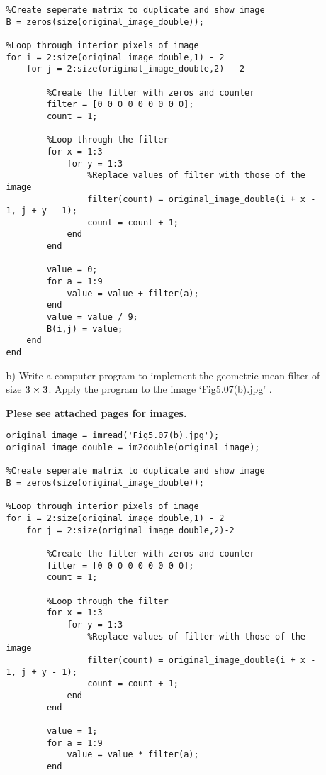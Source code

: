 \documentclass{article}
\begin{document}
\begin{enumerate}
\begin{enumerate}
\begin{lstlisting}
%Create seperate matrix to duplicate and show image
B = zeros(size(original_image_double));

%Loop through interior pixels of image
for i = 2:size(original_image_double,1) - 2
    for j = 2:size(original_image_double,2) - 2
        
        %Create the filter with zeros and counter
        filter = [0 0 0 0 0 0 0 0 0];
        count = 1;
        
        %Loop through the filter
        for x = 1:3
            for y = 1:3
                %Replace values of filter with those of the image
                filter(count) = original_image_double(i + x - 1, j + y - 1);
                count = count + 1;
            end
        end
        
        value = 0;
        for a = 1:9
            value = value + filter(a);
        end
        value = value / 9;
        B(i,j) = value;
    end
end
\end{lstlisting}

\newpage
\item[b)] Write a computer program to implement the geometric mean filter of size $3 \hspace{0.1mm} \times \hspace{0.1mm} 3$. Apply the program to the image `Fig5.07(b).jpg' .

\textbf{Plese see attached pages for images.}

\begin{lstlisting}
original_image = imread('Fig5.07(b).jpg');
original_image_double = im2double(original_image);

%Create seperate matrix to duplicate and show image
B = zeros(size(original_image_double));

%Loop through interior pixels of image
for i = 2:size(original_image_double,1) - 2
    for j = 2:size(original_image_double,2)-2
        
        %Create the filter with zeros and counter
        filter = [0 0 0 0 0 0 0 0 0];
        count = 1;
        
        %Loop through the filter
        for x = 1:3
            for y = 1:3
                %Replace values of filter with those of the image
                filter(count) = original_image_double(i + x - 1, j + y - 1);
                count = count + 1;
            end
        end
        
        value = 1;
        for a = 1:9
            value = value * filter(a);
        end
        

\end{lstlisting}
\end{enumerate}
\end{enumerate}
\end{document}
